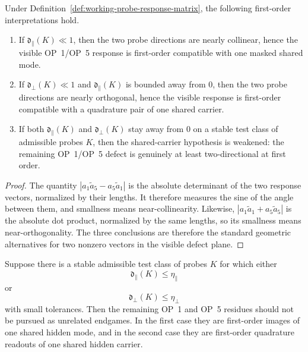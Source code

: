 \begin{proposition}
\label{prop:working-classification-shared-probe-response}
Under Definition~\ref{def:working-probe-response-matrix}, the following first-order interpretations hold.
\begin{enumerate}[label=(\roman*), leftmargin=2em]
  \item If $\mathfrak d_{\parallel}(K)\ll 1$, then the two probe directions are nearly collinear, hence the visible OP~1/OP~5 response is first-order compatible with one masked shared mode.
  \item If $\mathfrak d_{\perp}(K)\ll 1$ and $\mathfrak d_{\parallel}(K)$ is bounded away from $0$, then the two probe directions are nearly orthogonal, hence the visible response is first-order compatible with a quadrature pair of one shared carrier.
  \item If both $\mathfrak d_{\parallel}(K)$ and $\mathfrak d_{\perp}(K)$ stay away from $0$ on a stable test class of admissible probes $K$, then the shared-carrier hypothesis is weakened: the remaining OP~1/OP~5 defect is genuinely at least two-directional at first order.
\end{enumerate}
\end{proposition}

\begin{proof}
The quantity $|a_1\tilde a_5-a_5\tilde a_1|$ is the absolute determinant of the two response vectors, normalized by their lengths. It therefore measures the sine of the angle between them, and smallness means near-collinearity. Likewise, $|a_1\tilde a_1+a_5\tilde a_5|$ is the absolute dot product, normalized by the same lengths, so its smallness means near-orthogonality. The three conclusions are therefore the standard geometric alternatives for two nonzero vectors in the visible defect plane.
\end{proof}

\begin{corollary}
\label{cor:working-first-order-phase-picture-from-invariants}
Suppose there is a stable admissible test class of probes $K$ for which either
\[
  \mathfrak d_{\parallel}(K)\le \eta_{\parallel}
\]
or
\[
  \mathfrak d_{\perp}(K)\le \eta_{\perp}
\]
with small tolerances. Then the remaining OP~1 and OP~5 residues should not be pursued as unrelated endgames. In the first case they are first-order images of one shared hidden mode, and in the second case they are first-order quadrature readouts of one shared hidden carrier.
\end{corollary}

